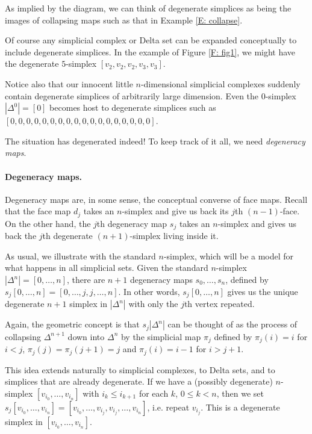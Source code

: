 \documentclass[12pt]{article}
\theoremstyle{plain}
\theoremstyle{definition}
\theoremstyle{remark}
\begin{document}
As implied by the diagram, we can think of degenerate simplices as being the images of collapsing maps such as that in Example \ref{E: collapse}.




Of course any simplicial complex or Delta set can be expanded conceptually to include degenerate simplices. In the example of Figure \ref{F: fig1}, we might have the degenerate $5$-simplex $[v_2,v_2, v_2,v_3, v_3]$.

Notice also that our innocent little $n$-dimensional simplicial complexes suddenly contain degenerate simplices of arbitrarily large dimension. Even the $0$-simplex $|\Delta^0|=[0]$ becomes host to degenerate simplices such as $[0,0,0,0,0,0,0,0,0,0,0,0,0,0,0,0,0,0]$. 

The situation has degenerated indeed! To keep track of it all, we need \emph{degeneracy maps}.
















\paragraph{Degeneracy maps.}

Degeneracy maps are, in some sense, the conceptual converse of face maps. Recall that the face map $d_j$ takes an $n$-simplex and give us back its $j$th $(n-1)$-face. On the other hand, the $j$th degeneracy map $s_j$ takes an $n$-simplex and gives us back the $j$th degenerate $(n+1)$-simplex living inside it. 

As usual, we illustrate with the standard $n$-simplex, which will be a model for what happens in all simplicial sets. Given the standard $n$-simplex $|\Delta^n|=[0,\ldots, n]$, there are $n+1$ degeneracy maps $s_0,\ldots, s_n$, defined by $s_j[0,\ldots, n]=[0,\ldots, j,j,\ldots, n]$. In other words, $s_j[0,\ldots,n]$ gives us the unique degenerate $n+1$ simplex in $|\Delta^n|$ with only the $j$th vertex repeated.


Again, the geometric concept is that $s_j|\Delta^n|$ can be thought of as the process of collapsing $\Delta^{n+1}$ down into $\Delta^n$ by the simplicial map $\pi_j$ defined by $\pi_j(i)=i$ for $i<j$, $\pi_j(j)=\pi_j(j+1)=j$ and $\pi_j(i)=i-1$ for $i>j+1$. 


This idea extends naturally to simplicial complexes, to Delta sets, and to simplices that are already degenerate. If we have a  (possibly degenerate) $n$-simplex $[v_{i_0},\ldots, v_{i_n}]$ with $i_k\leq i_{k+1}$ for each $k$, $0\leq k< n$, then we set $s_j[v_{i_0},\ldots, v_{i_n}]=[v_{i_0},\ldots, v_{i_j},v_{i_{j}},\ldots, v_{i_n}]$, i.e. repeat $v_{i_j}$. This is a degenerate simplex in $[v_{i_0},\ldots, v_{i_n}]$. 
\end{document}

